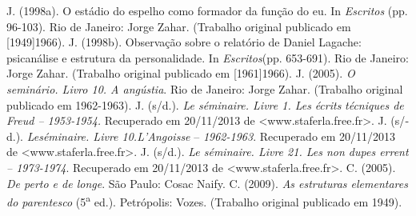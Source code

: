 \begin{multicols}{2}
\begin{scieloReferencesContainer}[Referências]
\allowbreak{} J.\allowbreak{} (\allowbreak{}1998a)\allowbreak{}.\allowbreak{} O estádio do espelho como formador da função do eu.\allowbreak{} In \textit{Escritos} (\allowbreak{}pp.\allowbreak{} 96-\allowbreak{}103)\allowbreak{}.\allowbreak{} Rio de Janeiro:\allowbreak{} Jorge Zahar.\allowbreak{} (\allowbreak{}Trabalho original publicado em [1949]1966)\allowbreak{}.\allowbreak{}
\allowbreak{} J.\allowbreak{} (\allowbreak{}1998b)\allowbreak{}.\allowbreak{} Observação sobre o relatório de Daniel Lagache:\allowbreak{} psicanálise e estrutura da personalidade.\allowbreak{} In \textit{Escritos}(\allowbreak{}pp.\allowbreak{} 653-\allowbreak{}691)\allowbreak{}.\allowbreak{} Rio de Janeiro:\allowbreak{} Jorge Zahar.\allowbreak{} (\allowbreak{}Trabalho original publicado em [1961]1966)\allowbreak{}.\allowbreak{}
\allowbreak{} J.\allowbreak{} (\allowbreak{}2005)\allowbreak{}.\allowbreak{} \textit{O seminário.\allowbreak{} Livro 10.\allowbreak{} A angústia}.\allowbreak{} Rio de Janeiro:\allowbreak{} Jorge Zahar.\allowbreak{} (\allowbreak{}Trabalho original publicado em 1962-\allowbreak{}1963)\allowbreak{}.\allowbreak{}
\allowbreak{} J.\allowbreak{} (\allowbreak{}s\fshyp{}d.\allowbreak{})\allowbreak{}.\allowbreak{} \textit{Le séminaire.\allowbreak{} Livre 1.\allowbreak{} Les }\textit{écrits}\textit{ técniques de Freud – 1953-\allowbreak{}1954.\allowbreak{}} Recuperado em 20\fshyp{}11\fshyp{}2013 de <www.\allowbreak{}staferla.\allowbreak{}free.\allowbreak{}fr>.\allowbreak{}
\allowbreak{} J.\allowbreak{} (\allowbreak{}s\fshyp{}d.\allowbreak{})\allowbreak{}.\allowbreak{} \textit{Le}\textit{séminaire.\allowbreak{} Livre 10.\allowbreak{}}\textit{L’Angoisse} –\textit{ 1962-\allowbreak{}1963}.\allowbreak{} Recuperado em 20\fshyp{}11\fshyp{}2013 de <www.\allowbreak{}staferla.\allowbreak{}free.\allowbreak{}fr>.\allowbreak{}
\allowbreak{} J.\allowbreak{} (\allowbreak{}s\fshyp{}d.\allowbreak{})\allowbreak{}.\allowbreak{} \textit{Le séminaire.\allowbreak{} Livre 21.\allowbreak{} Les non dupes errent – 1973-\allowbreak{}1974}.\allowbreak{} Recuperado em 20\fshyp{}11\fshyp{}2013 de <www.\allowbreak{}staferla.\allowbreak{}free.\allowbreak{}fr>.\allowbreak{}
\allowbreak{} C.\allowbreak{} (\allowbreak{}2005)\allowbreak{}.\allowbreak{} \textit{De perto e de longe}.\allowbreak{} São Paulo:\allowbreak{} Cosac Naify.\allowbreak{}
\allowbreak{} C.\allowbreak{} (\allowbreak{}2009)\allowbreak{}.\allowbreak{} \textit{As estruturas elementares do parentesco} (\allowbreak{}5\textsuperscript{a} ed.\allowbreak{})\allowbreak{}.\allowbreak{} Petrópolis:\allowbreak{} Vozes.\allowbreak{} (\allowbreak{}Trabalho original publicado em 1949)\allowbreak{}.\allowbreak{}

\end{scieloReferencesContainer}
\end{multicols}
